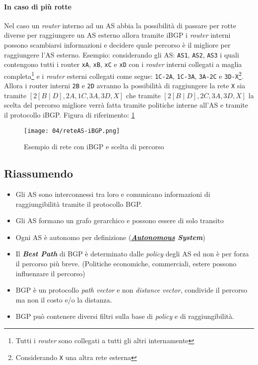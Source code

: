         \paragraph{In caso di più rotte} Nel caso un \textit{router} interno ad un \Acrshort*{AS} abbia la possibilità di passare per rotte diverse per raggiungere un \Acrshort*{AS} esterno allora tramite \Acrshort*{iBGP} i \textit{router} interni possono scambiarsi informazioni e decidere quale percorso è il migliore per raggiungere l'\Acrshort*{AS} esterno. Esempio: considerando gli \Acrshort*{AS}: \texttt{AS1}, \texttt{AS2}, \texttt{AS3} i quali contengono tutti i router \texttt{xA}, \texttt{xB}, \texttt{xC} e \texttt{xD} con i \textit{router} interni collegati a maglia completa\footnote{Tutti i \textit{router} sono collegati a tutti gli altri internamente} e i \textit{router} esterni collegati come segue: \texttt{1C-2A}, \texttt{1C-3A}, \texttt{3A-2C} e \texttt{3D-X}\footnote{Considerando \texttt{X} una altra rete esterna}. Allora i router interni \texttt{2B} e \texttt{2D} avranno la possibilità di raggiungere la rete \texttt{X} sia tramite $[2[B\mid D],2A,1C,3A,3D,X]$ che tramite $[2[B\mid D],2C,3A,3D,X]$ la scelta del percorso migliore verrà fatta tramite politiche interne all'\Acrshort*{AS} e tramite il protocollo \Acrshort*{iBGP}.\newline
        Figura di riferimento: \ref{fig:reteAS-iBGP}
        \begin{figure}[H]
            \centering
            \texttt{[image: 04/reteAS-iBGP.png]}
            \caption{Esempio di rete con \Acrshort*{iBGP} e scelta di percorso}
            \label{fig:reteAS-iBGP}
        \end{figure}
    \subsection*{Riassumendo}
        \begin{itemize}
            \item Gli \Acrshort*{AS} sono interconnessi tra loro e comunicano informazioni di raggiungibilità tramite il protocollo \Acrshort*{BGP}.
            \item Gli \Acrshort*{AS} formano un grafo gerarchico e possono essere di solo transito
            \item Ogni \Acrshort*{AS} è autonomo per definizione (\textit{\textbf{\underline{Autonomous}  System}})
            \item Il \textit{\textbf{Best Path}} di \Acrshort*{BGP} è determinato dalle \textit{policy} degli \Acrshort*{AS} ed non è per forza il percorso più breve. (Politiche economiche, commerciali, estere possono influenzare il percorso)
            \item \Acrshort*{BGP} è un protocollo \textit{path vector} e non \textit{distance vector}, condivide il percorso ma non il costo e/o la distanza.
            \item \Acrshort*{BGP} può contenere diversi filtri sulla base di \textit{policy} e di raggiungibilità.
        \end{itemize}